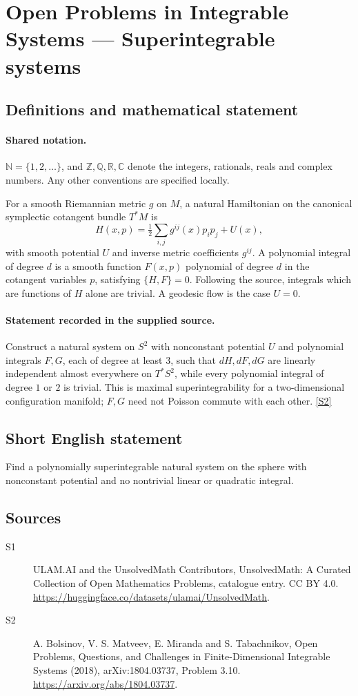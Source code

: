 \documentclass[11pt]{article}
\newcommand{\sref}[2]{\hyperlink{source:#1:#2}{[S#2]}}
\begin{document}
\section{Open Problems in Integrable Systems — Superintegrable systems}\label{statement}

\subsection{Definitions and mathematical statement}

\paragraph{Shared notation.}$\mathbb N=\{1,2,\ldots\}$, and $\mathbb Z,\mathbb Q,\mathbb R,\mathbb C$ denote the integers, rationals, reals and complex numbers. Any other conventions are specified locally.


For a smooth Riemannian metric $g$ on $M$, a natural Hamiltonian on the canonical symplectic cotangent bundle $T^*M$ is \[H(x,p)=\tfrac12\sum_{i,j}g^{ij}(x)p_ip_j+U(x),\] with smooth potential $U$ and inverse metric coefficients $g^{ij}$. A polynomial integral of degree $d$ is a smooth function $F(x,p)$ polynomial of degree $d$ in the cotangent variables $p$, satisfying $\{H,F\}=0$. Following the source, integrals which are functions of $H$ alone are trivial. A geodesic flow is the case $U=0$.
\paragraph{Statement recorded in the supplied source.}
Construct a natural system on $S^2$ with nonconstant potential $U$ and polynomial integrals $F,G$, each of degree at least $3$, such that $dH,dF,dG$ are linearly independent almost everywhere on $T^*S^2$, while every polynomial integral of degree $1$ or $2$ is trivial. This is maximal superintegrability for a two-dimensional configuration manifold; $F,G$ need not Poisson commute with each other. \sref{statement}{2}
\subsection{Short English statement}
Find a polynomially superintegrable natural system on the sphere with nonconstant potential and no nontrivial linear or quadratic integral.
\subsection{Sources}
\begin{description}
\item[\hypertarget{source:statement:1}{S1}] ULAM.AI and the UnsolvedMath Contributors, UnsolvedMath: A Curated Collection of Open Mathematics Problems, catalogue entry. CC BY 4.0. \url{https://huggingface.co/datasets/ulamai/UnsolvedMath}.
\item[\hypertarget{source:statement:2}{S2}] A. Bolsinov, V. S. Matveev, E. Miranda and S. Tabachnikov, Open Problems, Questions, and Challenges in Finite-Dimensional Integrable Systems (2018), arXiv:1804.03737, Problem 3.10. \url{https://arxiv.org/abs/1804.03737}.
\end{description}
\label{end:statement}
\end{document}
